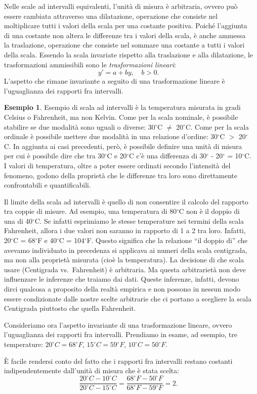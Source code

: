 \documentclass[
]{memoir}
\theoremstyle{definition}
\theoremstyle{definition}
\newtheorem{example}{Esempio}[chapter]
\theoremstyle{definition}
\theoremstyle{definition}
\theoremstyle{remark}
\begin{document}
Nelle scale ad intervalli equivalenti, l'unità di misura è arbitraria,
ovvero può essere cambiata attraverso una dilatazione, operazione che
consiste nel moltiplicare tutti i valori della scala per una costante
positiva. Poiché l'aggiunta di una costante non altera le differenze tra
i valori della scala, è anche ammessa la traslazione, operazione che
consiste nel sommare una costante a tutti i valori della scala. Essendo
la scala invariate rispetto alla traslazione e alla dilatazione, le
trasformazioni ammissibili sono le \emph{trasformazioni lineari}:
\[y' = a + by, \quad b > 0.\]
L'aspetto che rimane invariante a seguito di una trasformazione lineare
è l'uguaglianza dei rapporti fra intervalli.

\begin{example}
Esempio di scala ad intervalli è la temperatura misurata in gradi
Celsius o Fahrenheit, ma non Kelvin. Come per la scala nominale, è
possibile stabilire se due modalità sono uguali o diverse: 30\(^\circ\)C
\(\neq\) 20\(^\circ\)C. Come per la scala ordinale è possibile mettere due
modalità in una relazione d'ordine: 30\(^\circ\)C \(>\) 20\(^\circ\)C. In
aggiunta ai casi precedenti, però, è possibile definire una unità di
misura per cui è possibile dire che tra 30\(^\circ\)C e 20\(^\circ\)C c'è
una differenza di 30\(^\circ\) - 20\(^\circ\) = 10\(^\circ\)C. I valori di
temperatura, oltre a poter essere ordinati secondo l'intensità del
fenomeno, godono della proprietà che le differenze tra loro sono
direttamente confrontabili e quantificabili.

Il limite della scala ad intervalli è quello di non consentire il
calcolo del rapporto tra coppie di misure. Ad esempio, una temperatura
di 80\(^\circ\)C non è il doppio di una di 40\(^\circ\)C. Se infatti
esprimiamo le stesse temperature nei termini della scala Fahrenheit,
allora i due valori non saranno in rapporto di 1 a 2 tra loro. Infatti,
20\(^\circ\)C = 68\(^\circ\)F e 40\(^\circ\)C = 104\(^\circ\)F. Questo significa
che la relazione ``il doppio di'' che avevamo individuato in precedenza si
applicava ai numeri della scala centigrada, ma non alla proprietà
misurata (cioè la temperatura). La decisione di che scala usare
(Centigrada vs.~Fahrenheit) è arbitraria. Ma questa arbitrarietà non
deve influenzare le inferenze che traiamo dai dati. Queste inferenze,
infatti, devono dirci qualcosa a proposito della realtà empirica e non
possono in nessun modo essere condizionate dalle nostre scelte
arbitrarie che ci portano a scegliere la scala Centigrada piuttosto che
quella Fahrenheit.

Consideriamo ora l'aspetto invariante di una trasformazione lineare, ovvero l'uguaglianza dei rapporti fra intervalli. Prendiamo in esame, ad esempio, tre temperature:
\(20^\circ C = 68^\circ F\),
\(15^\circ C = 59^\circ F\),
\(10^\circ C = 50 ^\circ F\).

È facile rendersi conto del fatto che i rapporti fra intervalli restano costanti indipendentemente dall'unità di misura che è stata scelta:
\[
  \frac{20^\circ C - 10^\circ C}{20^\circ C - 15^\circ C} =
  \frac{68^\circ F - 50^\circ F}{68^\circ F-59^\circ F} = 2.
\]
\end{example}
\end{document}
